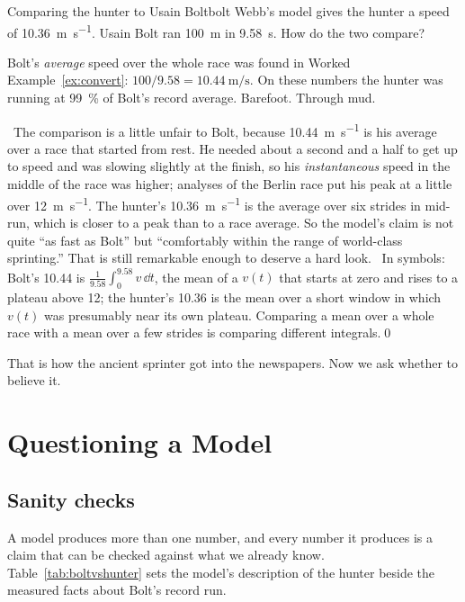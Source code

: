 \begin{example}{Comparing the hunter to Usain Bolt}{bolt}
Webb's model gives the hunter a speed of \SI{10.36}{\metre\per\second}. Usain Bolt ran \SI{100}{\metre} in \SI{9.58}{\second}. How do the two compare?

\solution Bolt's \emph{average} speed over the whole race was found in Worked Example~\ref{ex:convert}: $100/9.58 = \SI{10.44}{\metre\per\second}$. On these numbers the hunter was running at \SI{99}{\percent} of Bolt's record average. Barefoot. Through mud.

\elemtag\ The comparison is a little unfair to Bolt, because \SI{10.44}{\metre\per\second} is his average over a race that started from rest. He needed about a second and a half to get up to speed and was slowing slightly at the finish, so his \emph{instantaneous} speed in the middle of the race was higher; analyses of the Berlin race put his peak at a little over \SI{12}{\metre\per\second}. The hunter's \SI{10.36}{\metre\per\second} is the average over six strides in mid-run, which is closer to a peak than to a race average. So the model's claim is not quite ``as fast as Bolt'' but ``comfortably within the range of world-class sprinting.'' That is still remarkable enough to deserve a hard look. \calctag\ In symbols: Bolt's \num{10.44} is $\frac{1}{9.58}\int_0^{9.58} v\,\dd t$, the mean of a $v(t)$ that starts at zero and rises to a plateau above \num{12}; the hunter's \num{10.36} is the mean over a short window in which $v(t)$ was presumably near its own plateau. Comparing a mean over a whole race with a mean over a few strides is comparing different integrals.\qed
\end{example}

That is how the ancient sprinter got into the newspapers. Now we ask whether to believe it.

\section{Questioning a Model}
\label{sec:questioning}

\subsection{Sanity checks}

A model produces more than one number, and every number it produces is a claim that can be checked against what we already know. Table~\ref{tab:boltvshunter} sets the model's description of the hunter beside the measured facts about Bolt's record run.

